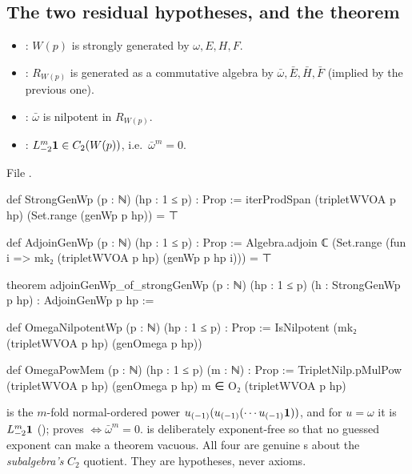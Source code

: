 \subsection{The two residual hypotheses, and the theorem}

\begin{definition}\label{l18:def:residuals}
\begin{itemize}
\item {}: $W(p)$ is strongly generated by $\omega,E,H,F$.
\item {}: $R_{W(p)}$ is generated as a commutative algebra by
  $\bar\omega,\bar E,\bar H,\bar F$ (implied by the previous one).
\item {}: $\bar\omega$ is nilpotent in $R_{W(p)}$.
\item {}: $L_{-2}^m\mathbf{1}\in C_2(W(p))$, i.e.\ $\bar\omega^m=0$.
\end{itemize}
\end{definition}
\noindent File .
\begin{leancode}
def StrongGenWp (p : ℕ) (hp : 1 ≤ p) : Prop :=
  iterProdSpan (tripletWVOA p hp) (Set.range (genWp p hp)) = ⊤

def AdjoinGenWp (p : ℕ) (hp : 1 ≤ p) : Prop :=
  Algebra.adjoin ℂ (Set.range (fun i => mk₂ (tripletWVOA p hp) (genWp p hp i))) = ⊤

theorem adjoinGenWp_of_strongGenWp (p : ℕ) (hp : 1 ≤ p) (h : StrongGenWp p hp) :
    AdjoinGenWp p hp :=

def OmegaNilpotentWp (p : ℕ) (hp : 1 ≤ p) : Prop :=
  IsNilpotent (mk₂ (tripletWVOA p hp) (genOmega p hp))

def OmegaPowMem (p : ℕ) (hp : 1 ≤ p) (m : ℕ) : Prop :=
  TripletNilp.pMulPow (tripletWVOA p hp) (genOmega p hp) m ∈ O₂ (tripletWVOA p hp)
\end{leancode}
\begin{dictionary}
 is the $m$-fold normal-ordered power $u_{(-1)}(u_{(-1)}(\cdots u_{(-1)}\mathbf{1}))$,
and for $u=\omega$ it is $L_{-2}^m\mathbf{1}$ (); 
proves  $\iff\bar\omega^m=0$.  is deliberately exponent-free
so that no guessed exponent can make a theorem vacuous. All four are genuine s about the
\emph{subalgebra's} $C_2$ quotient. They are hypotheses, never axioms.
\end{dictionary}
